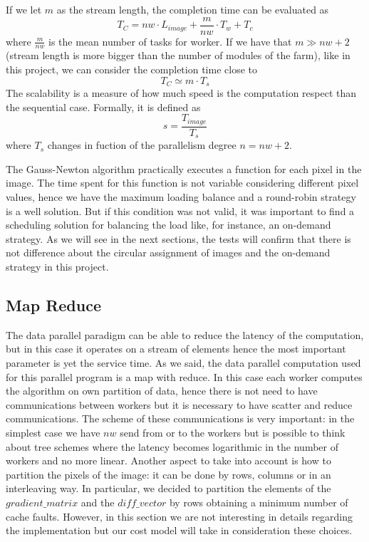 If we let $m$ as the stream length, the completion time can be evaluated as
\[
T_{C} = nw \cdot L_{image} + \frac{m}{nw} \cdot T_{w} + T_{c} 
\]
where $\frac{m}{nw}$ is the mean number of tasks for worker.
If we have that $m \gg nw+2$ (stream length is more bigger than the number of modules of the farm), like in this project, we can consider the completion time close to
\begin{equation}
\label{completiontime}
T_{C} \simeq m \cdot T_{s}
\end{equation}
The scalability is a measure of how much speed is the computation respect than the sequential case. Formally, it is defined as
\begin{equation}
\label{scalability}
s = \frac{T_{image}}{T_{s}}
\end{equation}
where $T_{s}$ changes in fuction of the parallelism degree $n=nw+2$.

The Gauss-Newton algorithm practically executes a function for each pixel in the image. The time spent for this function is not variable considering different pixel values, hence we have the maximum loading balance and a round-robin strategy is a well solution. But if this condition was not valid, it was important to find a scheduling solution for balancing the load like, for instance, an on-demand strategy. As we will see in the next sections, the tests will confirm that there is not difference about the circular assignment of images and the on-demand strategy in this project.

\subsection{Map Reduce}

The data parallel paradigm can be able to reduce the latency of the computation, but in this case it operates on a stream of elements hence the most important parameter is yet the service time. As we said, the data parallel computation used for this parallel program is a map with reduce. In this case each worker computes the algorithm on own partition of data, hence there is not need to have communications between workers but it is necessary to have scatter and reduce communications. The scheme of these communications is very important: in the simplest case we have $nw$ send from or to the workers but is possible to think about tree schemes where the latency becomes logarithmic in the number of workers and no more linear. Another aspect to take into account is how to partition the pixels of the image: it can be done by rows, columns or in an interleaving way. In particular, we decided to partition the elements of the $gradient\_matrix$ and the $diff\_vector$ by rows obtaining a minimum number of cache faults. However, in this section we are not interesting in details regarding the implementation but our cost model will take in consideration these choices.

